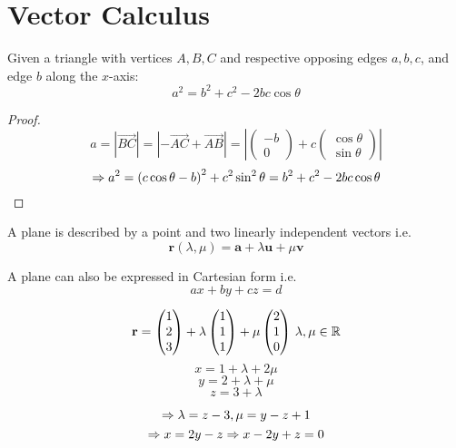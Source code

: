 \documentclass[a4paper,10pt]{article}
\begin{document}
\section{Vector Calculus}

\begin{thm}
	Given a triangle with vertices $A,B,C$ and respective opposing edges
	$a,b,c$, and edge $b$ along the $x$-axis:
	\[ a^2 = b^2 + c^2 - 2bc\cos\theta \]
\end{thm}

\begin{proof}
	\[
		a = |\vec{BC}| = |-\vec{AC} + \vec{AB}|
		= \left|\begin{pmatrix}-b\\0\end{pmatrix} +
			c\begin{pmatrix}\cos\theta\\\sin\theta\end{pmatrix}\right|
	\]
	\[
		\Rightarrow a^2 = {(c\cos\theta - b)}^2 + c^2\sin^2\theta
		= b^2 + c^2 - 2bc\cos\theta
	\]
\end{proof}

A plane is described by a point and two linearly independent vectors i.e.
\[\mathbf{r}(\lambda, \mu) = \mathbf{a} + \lambda \mathbf{u} + \mu \mathbf{v}\]

A plane can also be expressed in Cartesian form i.e.
\[ax + by + cz = d\]

\begin{ex}
	\[
		\mathbf{r} =
		\begin{pmatrix}
			1\\2\\3
		\end{pmatrix}
		+ \lambda
		\begin{pmatrix}
			1\\1\\1
		\end{pmatrix}
		+ \mu
		\begin{pmatrix}
			2\\1\\0
		\end{pmatrix}
		\, \lambda, \mu \in \mathbb{R}
	\]
	\[ x = 1 + \lambda + 2\mu \]
	\[ y = 2 + \lambda + \mu \]
	\[ z = 3 + \lambda \]

	\[ \Rightarrow \lambda = z - 3, \mu = y - z + 1 \]
	\[ \Rightarrow x = 2y - z \Rightarrow x - 2y + z = 0 \]
\end{ex}
\end{document}
